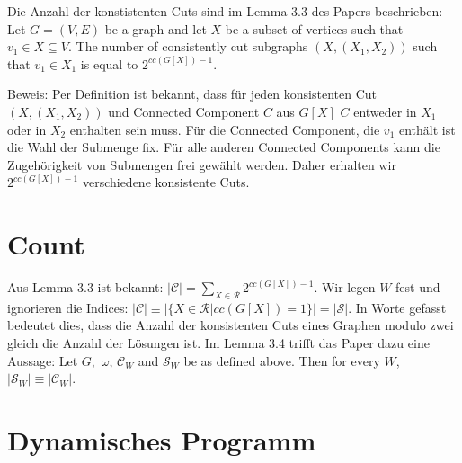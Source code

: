 Die Anzahl der konstistenten Cuts sind im Lemma 3.3 des Papers beschrieben:\\
Let $G=(V,E)$ be a graph and let $X$ be a subset of vertices such that $v_1 \in X \subseteq V$. The number of consistently cut subgraphs $(X,(X_1,X_2))$ such that $v_1 \in X_1$ is equal to $2^{cc(G[X])-1}$.

Beweis: Per Definition ist bekannt, dass für jeden konsistenten Cut $(X,(X_1,X_2))$ und Connected Component $C$ aus $G[X]$ $C$ entweder in $X_1$ oder in $X_2$ enthalten sein muss. Für die Connected Component, die $v_1$ enthält ist die Wahl der Submenge fix. Für alle anderen Connected Components kann die Zugehörigkeit von Submengen frei gewählt werden. Daher erhalten wir $2^{cc(G[X])-1}$ verschiedene konsistente Cuts.

\section{Count}
\label{sec:st_count}
Aus Lemma 3.3 ist bekannt: $|\mathcal{C}|=\sum_{X \in \mathcal{R}} 2^{cc(G[X])-1}$. Wir legen $W$ fest und ignorieren die Indices: $|\mathcal{C}| \equiv |\{X \in \mathcal{R} |cc(G[X]) = 1\}| = |\mathcal{S}|$. In Worte gefasst bedeutet dies, dass die Anzahl der konsistenten Cuts eines Graphen modulo zwei gleich die Anzahl der Lösungen ist. Im Lemma 3.4 trifft das Paper dazu eine Aussage: Let $G,$ $\omega$, $\mathcal{C}_W$ and $\mathcal{S}_W$ be as defined above. Then for every $W$, $|\mathcal{S}_W| \equiv |\mathcal{C}_W|$.

\section{Dynamisches Programm}
\label{sec:dynP}

